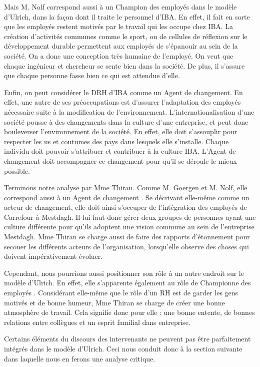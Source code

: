 Mais M. Nolf correspond aussi à un \og Champion des employés \fg{} dans le modèle d'Ulrich, dans la façon dont il traite le personnel d'IBA. En effet, il fait en sorte que les employés restent motivés par le travail qui les occupe chez IBA. La création d'activités communes comme le sport, ou de cellules de réflexion sur le développement durable permettent aux employés de s'épanouir au sein de la société. On a donc une conception très humaine de l'employé. On veut que chaque ingénieur et chercheur se sente bien dans la société. De plus, il s'assure que chaque personne fasse bien ce qui est attendue d'elle. \newline

Enfin, on peut considérer le DRH d'IBA comme un \og{}Agent de changement\fg{}. En effet, une autre de ses préoccupations est d'assurer l'adaptation des employés nécessaire suite à la modification de l'environnement. L'internationalisation d'une société pousse à des changements dans la culture d'une entreprise, et peut donc bouleverser l'environnement de la société. En effet, elle doit s'assouplir pour respecter les us et coutumes des pays dans lesquels elle s'installe. Chaque individu doit pouvoir s'attribuer et contribuer à la culture IBA. L'\og{}Agent de changement\fg{} doit accompagner ce changement pour qu'il se déroule le mieux possible. \newline

Terminons notre analyse par Mme Thiran. Comme M. Goergen et M. Nolf, elle correspond aussi à un \og Agent de changement \fg{} . Se décrivant elle-même comme un acteur de changement, elle doit ainsi s'occuper de l'intégration des employés de Carrefour à Mestdagh. Il lui faut donc gérer deux groupes de personnes ayant une culture différente pour qu'ils adoptent une vision commune au sein de l'entreprise Mestdagh. Mme Thiran se charge aussi de faire des rapports d'étonnement pour \og secouer \fg{} les différents acteurs de l'organisation, lorsqu'elle observe des choses qui doivent impérativement évoluer.\newline

Cependant, nous pourrions aussi positionner son rôle à un autre endroit sur le modèle d'Ulrich. En effet, elle s'apparente également au rôle de \og Championne des employés \fg{}. Considérant elle-même que le rôle d'un RH est de garder les gens motivés et de bonne humeur, Mme Thiran se charge de créer une bonne atmosphère de travail. Cela signifie donc pour elle : une bonne entente, de bonnes relations entre collègues et un esprit familial dans entreprise. 

Certains éléments du discours des intervenants ne peuvent pas être parfaitement intégrés dans le modèle d'Ulrich. Ceci nous conduit donc à la section suivante dans laquelle nous en ferons une analyse critique.
